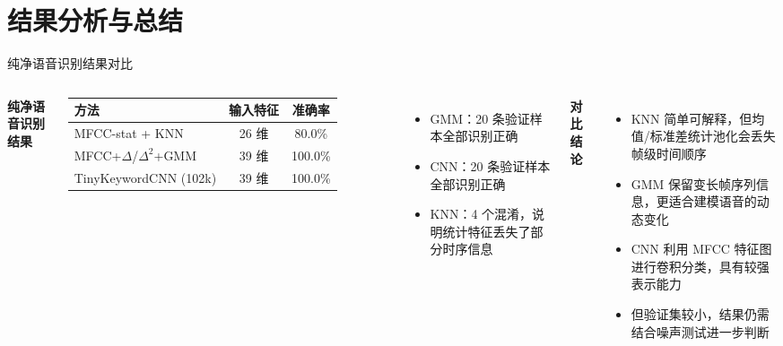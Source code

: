 
\section{结果分析与总结}

\begin{frame}{纯净语音识别结果对比}
  \small
  \begin{columns}[T]
    \centering
    \textbf{纯净语音识别结果}
    \vspace{4pt}

    \begin{tabular}{lcc}
      \toprule
      \textbf{方法} & \textbf{输入特征} & \textbf{准确率} \\
      \midrule
      MFCC-stat + KNN   & 26 维 & 80.0\% \\
      MFCC+$\Delta$/$\Delta^2$+GMM & 39 维 & 100.0\% \\
      TinyKeywordCNN (102k) & 39 维 & 100.0\% \\
      \bottomrule
    \end{tabular}

    \vspace{8pt}
    \raggedright
    \begin{itemize}
      \setlength{\itemsep}{2pt}
      \item GMM：20 条验证样本全部识别正确
      \item CNN：20 条验证样本全部识别正确
      \item KNN：4 个混淆，说明统计特征丢失了部分时序信息
    \end{itemize}

    \textbf{对比结论}
    \begin{itemize}
      \setlength{\itemsep}{4pt}
      \item KNN 简单可解释，但均值/标准差统计池化会丢失帧级时间顺序
      \item GMM 保留变长帧序列信息，更适合建模语音的动态变化
      \item CNN 利用 MFCC 特征图进行卷积分类，具有较强表示能力
      \item 但验证集较小，结果仍需结合噪声测试进一步判断
    \end{itemize}
  \end{columns}
\end{frame}

